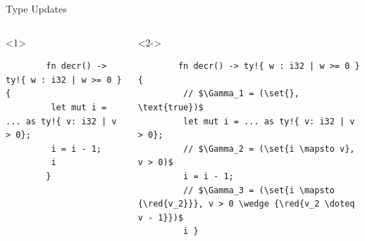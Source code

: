 \documentclass{sdqbeamer}
\newcommand{\set}[1]{\left\{ #1 \right\}}
\newcommand{\red}[1]{\color{kit-red90}{ #1 }}
\begin{document}
\begin{frame}[fragile]{Type Updates}
  \begin{columns}
    \begin{onlyenv}<1>
      \begin{verbatim}
        fn decr() -> ty!{ w : i32 | w >= 0 } {
         let mut i = ... as ty!{ v: i32 | v > 0};
         i = i - 1;
         i
        }
      \end{verbatim}
    \end{onlyenv}
    \begin{onlyenv}<2->
      \begin{verbatim}
        fn decr() -> ty!{ w : i32 | w >= 0 } {
         // $\Gamma_1 = (\set{}, \text{true})$
         let mut i = ... as ty!{ v: i32 | v > 0};
         // $\Gamma_2 = (\set{i \mapsto v}, v > 0)$
         i = i - 1;
         // $\Gamma_3 = (\set{i \mapsto {\red{v_2}}}, v > 0 \wedge {\red{v_2 \doteq v - 1}})$
         i }
      \end{verbatim}
    \end{onlyenv}

  \end{columns}


\end{frame}
\end{document}
